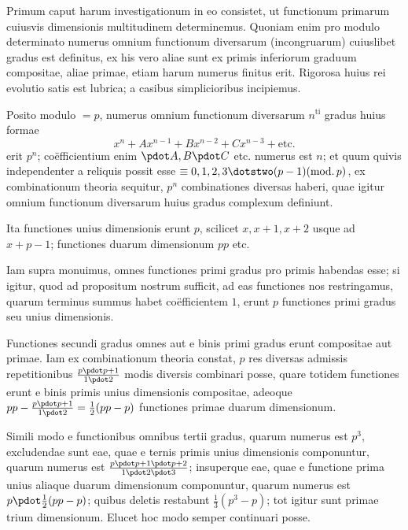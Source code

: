 Primum caput harum investigationum in eo consistet, ut functionum primarum cuiusvis dimensionis multitudinem determinemus. Quoniam enim pro modulo determinato numerus omnium functionum diversarum (incongruarum) cuiuslibet gradus est definitus, ex his vero aliae sunt ex primis inferiorum graduum compositae, aliae primae, etiam harum numerus finitus erit. Rigorosa huius rei evolutio satis est lubrica; a casibus simplicioribus incipiemus.

Posito modulo $=p$, numerus omnium functionum diversarum $n^{\mathrm{ti}}$ gradus huius formae
\[
x^n+Ax^{n-1}+Bx^{n-2}+Cx^{n-3}+\text{etc.}
\]
erit $p^n$; coëfficientium enim $\pdot A,B\pdot C$ etc. numerus est $n$; et quum quivis independenter a reliquis possit esse $\equiv0,1,2,3\dotstwo(p-1)(\mathrm{mod.}\,p)$, ex combinationum theoria sequitur, $p^n$ combinationes diversas haberi, quae igitur omnium functionum diversarum huius gradus complexum definiunt.

Ita functiones unius dimensionis erunt $p$, scilicet $x,x+1,x+2$ usque ad $x+p-1$; functiones duarum dimensionum $pp$ etc.

Iam supra monuimus, omnes functiones primi gradus pro primis habendas esse; si igitur, quod ad propositum nostrum sufficit, ad eas functiones nos restringamus, quarum terminus summus habet coëfficientem $1$, erunt $p$ functiones primi gradus seu unius dimensionis.

Functiones secundi gradus omnes aut e binis primi gradus erunt compositae aut primae. Iam ex combinationum theoria constat, $p$ res diversas admissis repetitionibus $\frac{p\pdot p+1}{1\pdot2}$ modis diversis combinari posse, quare totidem functiones erunt e binis primis unius dimensionis compositae, adeoque $pp-\frac{p\pdot p+1}{1\pdot2}=\frac12(pp-p)$ functiones primae duarum dimensionum.

Simili modo e functionibus omnibus tertii gradus, quarum numerus est $p^3$, excludendae sunt eae, quae e ternis primis unius dimensionis componuntur, quarum numerus est $\frac{p\pdot p+1\pdot p+2}{1\pdot2\pdot3}$; insuperque eae, quae e functione prima unius aliaque duarum dimensionum componuntur, quarum numerus est $p\pdot\frac12(pp-p)$; quibus deletis restabunt $\frac13(p^3-p)$; tot igitur sunt primae trium dimensionum. Elucet hoc modo semper continuari posse.

